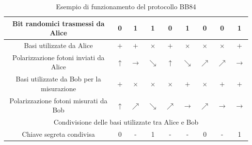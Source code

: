 \begin{table}[H]
\centering
    \begin{tabular}{|c|c|c|c|c|c|c|c|c|}
    \hline
    Bit randomici trasmessi da Alice & 0 & 1 & 1 & 0 & 1 & 0 & 0 & 1\\
    \hline \hline
    Basi utilizzate da Alice & $+$ & $+$ & $\times$ & $+$ & $\times$ & $\times$ & $\times$ & $+$\\
    \hline
    Polarizzazione fotoni inviati da Alice & $\uparrow$ & $\rightarrow$ & $\searrow$ & $\uparrow$ & $\searrow$ & $\nearrow$ & $\nearrow$ & $\rightarrow$\\
    \hline \hline
    Basi utilizzate da Bob per la misurazione & $+$ & $\times$ & $\times$ & $\times$ & $+$ & $\times$ & $+$ & $+$\\
    \hline
    Polarizzazione fotoni misurati da Bob & $\uparrow$ & $\nearrow$ & $\searrow$ & $\nearrow$ & $\rightarrow$ & $\nearrow$ & $\rightarrow$ & $\rightarrow$\\
    \hline \hline
    \multicolumn{9}{|c|}{Condivisione delle basi utilizzate tra Alice e Bob}\\
    \hline \hline 
    Chiave segreta condivisa & 0 & - & 1 & - & - & 0 & - & 1 \\
    \hline 
    \end{tabular}
    \caption{Esempio di funzionamento del protocollo BB84}
    \label{tab:BB84}
\end{table}
\newpage
